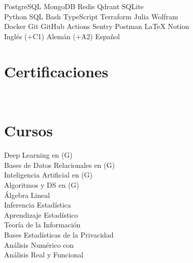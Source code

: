 \documentclass{tex/deedy-resume-openfont}
\begin{document}
\begin{minipage}[t]{0.32\textwidth}
PostgreSQL \textbullet{} 
MongoDB \textbullet{} 
Redis \textbullet{} 
Qdrant \textbullet{} 
SQLite \\[4pt]

Python \textbullet{} 
SQL \textbullet{} 
Bash \textbullet{} 
TypeScript \textbullet{} 
Terraform \textbullet{} 
Julia \textbullet{} 
Wolfram \\[4pt]

Docker \textbullet{} 
Git \textbullet{} 
GitHub Actions \textbullet{} 
Sentry \textbullet{} 
Postman \textbullet{} 
\LaTeX{} \textbullet{} 
Notion \\[4pt]

Inglés ($+$C1) \textbullet{} Alemán ($+$A2) \textbullet{} Español\\[4pt]


\section{Certificaciones}
\href{https://www.credly.com/badges/e618901b-4ee9-4470-aa58-df98790f17ea/public_url}{}\\[4pt]


\section{Cursos}
Deep Learning en (G)\\
Bases de Datos Relacionales en  (G)\\
Inteligencia Artificial en  (G)\\
Algoritmos y DS en  (G)\\
Álgebra Lineal\\[4pt]

Inferencia Estadística\\
Aprendizaje Estadístico\\
Teoría de la Información\\
Bases Estadísticas de la Privacidad\\
Análisis Numérico con \\
Análisis Real y Funcional


%
%

\end{minipage} 
\end{document}

